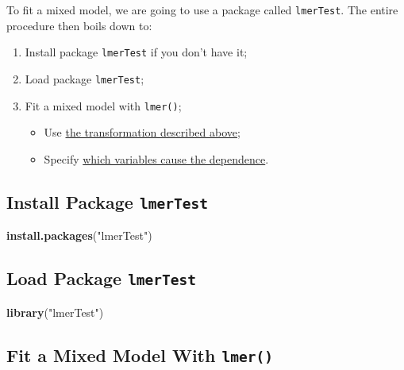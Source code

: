 \documentclass[
]{book}
\newenvironment{Shaded}{\begin{snugshade}}{\end{snugshade}}
\newcommand{\KeywordTok}[1]{\textcolor[rgb]{0.13,0.29,0.53}{\textbf{#1}}}
\newcommand{\NormalTok}[1]{#1}
\newcommand{\StringTok}[1]{\textcolor[rgb]{0.31,0.60,0.02}{#1}}
\providecommand{\tightlist}{%
  \setlength{\itemsep}{0pt}\setlength{\parskip}{0pt}}
\begin{document}
To fit a mixed model, we are going to use a package called \texttt{lmerTest}. The entire procedure then boils down to:

\begin{enumerate}
\def\labelenumi{\arabic{enumi}.}
\tightlist
\item
  Install package \texttt{lmerTest} if you don't have it;
\item
  Load package \texttt{lmerTest};
\item
  Fit a mixed model with \texttt{lmer()};

  \begin{itemize}
  \tightlist
  \item
    Use \protect\hyperlink{braintransform}{the transformation described above};
  \item
    Specify \protect\hyperlink{braindependence}{which variables cause the dependence}.
  \end{itemize}
\end{enumerate}

\hypertarget{install-package-lmertest}{%
\subsection{\texorpdfstring{Install Package \texttt{lmerTest}}{Install Package lmerTest}}\label{install-package-lmertest}}

\begin{Shaded}
\begin{Highlighting}[]
\KeywordTok{install.packages}\NormalTok{(}\StringTok{"lmerTest"}\NormalTok{)}
\end{Highlighting}
\end{Shaded}

\hypertarget{load-package-lmertest}{%
\subsection{\texorpdfstring{Load Package \texttt{lmerTest}}{Load Package lmerTest}}\label{load-package-lmertest}}

\begin{Shaded}
\begin{Highlighting}[]
\KeywordTok{library}\NormalTok{(}\StringTok{"lmerTest"}\NormalTok{)}
\end{Highlighting}
\end{Shaded}

\hypertarget{brainmodel}{%
\subsection{\texorpdfstring{Fit a Mixed Model With \texttt{lmer()}}{Fit a Mixed Model With lmer()}}\label{brainmodel}}
\end{document}
